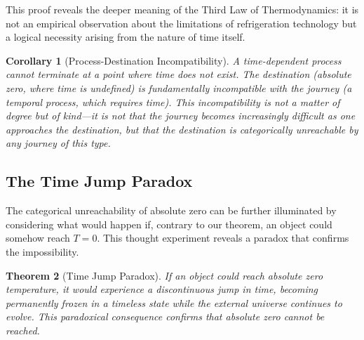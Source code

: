 \documentclass[12pt,a4paper]{article}
\newtheorem{theorem}{Theorem}[section]
\newtheorem{corollary}[theorem]{Corollary}
\theoremstyle{definition}
\theoremstyle{remark}
\begin{document}
This proof reveals the deeper meaning of the Third Law of Thermodynamics: it is not an empirical observation about the limitations of refrigeration technology but a logical necessity arising from the nature of time itself.

\begin{corollary}[Process-Destination Incompatibility]
A time-dependent process cannot terminate at a point where time does not exist. The destination (absolute zero, where time is undefined) is fundamentally incompatible with the journey (a temporal process, which requires time). This incompatibility is not a matter of degree but of kind—it is not that the journey becomes increasingly difficult as one approaches the destination, but that the destination is categorically unreachable by any journey of this type.
\end{corollary}

\subsection{The Time Jump Paradox}

The categorical unreachability of absolute zero can be further illuminated by considering what would happen if, contrary to our theorem, an object could somehow reach $T = 0$. This thought experiment reveals a paradox that confirms the impossibility.

\begin{theorem}[Time Jump Paradox]
\label{thm:time_jump}
If an object could reach absolute zero temperature, it would experience a discontinuous jump in time, becoming permanently frozen in a timeless state while the external universe continues to evolve. This paradoxical consequence confirms that absolute zero cannot be reached.
\end{theorem}
\end{document}
